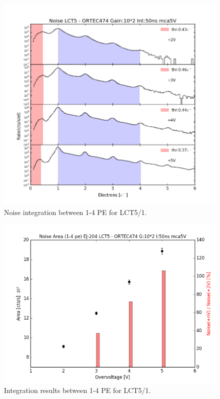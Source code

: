 \documentclass[10pt,a4paper, openany]{book}
\begin{document}
\begin{figure}[!h]
\begin{center}
\includegraphics[scale=0.45]{imm/noise_lct5_int.png}
\end{center}
\caption{Noise integration between 1-4 PE for LCT5/1.} 
\label{fig:noise_lct5_int}
\end{figure} 

\begin{figure}[!h]
\begin{center}
\includegraphics[scale=0.45]{imm/noise_lct5_area.png}
\end{center}
\caption{Integration results between 1-4 PE for LCT5/1.} 
\label{fig:noise_lct5_area}
\end{figure} 
\end{document}
